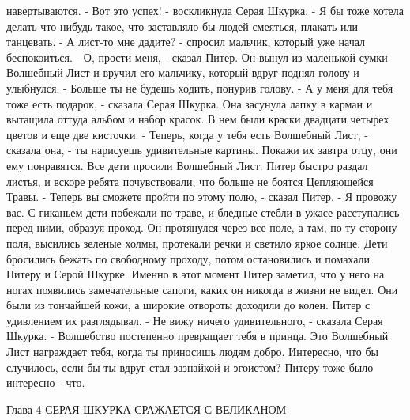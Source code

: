 навертываются.
    - Вот это успех! - воскликнула Серая Шкурка. - Я бы тоже хотела 
делать что-нибудь такое, что заставляло бы людей смеяться, плакать или 
танцевать.
    - А лист-то мне дадите? - спросил мальчик, который уже начал 
беспокоиться.
    - О, прости меня, - сказал Питер. Он вынул из маленькой сумки 
Волшебный Лист и вручил его мальчику, который вдруг поднял голову и 
улыбнулся. - Больше ты не будешь ходить, понурив голову.
    - А у меня для тебя тоже есть подарок, - сказала Серая Шкурка. Она 
засунула лапку в карман и вытащила оттуда альбом и набор красок. В нем 
были краски двадцати четырех цветов и еще две кисточки.
    - Теперь, когда у тебя есть Волшебный Лист, - сказала она, - ты 
нарисуешь удивительные картины. Покажи их завтра отцу, они ему 
понравятся.
    Все дети просили Волшебный Лист. Питер быстро раздал листья, и 
вскоре ребята почувствовали, что больше не боятся Цепляющейся Травы.
    - Теперь вы сможете пройти по этому полю, - сказал Питер. - Я 
провожу вас.
    С гиканьем дети побежали по траве, и бледные стебли в ужасе 
расступались перед ними, образуя проход. Он протянулся через все поле, 
а там, по ту сторону поля, высились зеленые холмы, протекали речки и 
светило яркое солнце. Дети бросились бежать по свободному проходу, 
потом остановились и помахали Питеру и Серой Шкурке.
    Именно в этот момент Питер заметил, что у него на ногах появились 
замечательные сапоги, каких он никогда в жизни не видел. Они были из 
тончайшей кожи, а широкие отвороты доходили до колен. Питер с 
удивлением их разглядывал.
    - Не вижу ничего удивительного, - сказала Серая Шкурка. - 
Волшебство постепенно превращает тебя в принца. Это Волшебный Лист 
награждает тебя, когда ты приносишь людям добро. Интересно, что бы 
случилось, если бы ты вдруг стал зазнайкой и эгоистом?
    Питеру тоже было интересно - что.

        Глава 4
        СЕРАЯ ШКУРКА СРАЖАЕТСЯ С ВЕЛИКАНОМ

